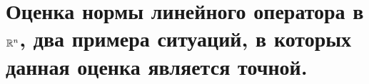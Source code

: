 \documentclass[../main.tex]{subfiles}
\begin{document}
\newpage
\section{Оценка нормы линейного оператора в \( \mathbb{R} ^n\), два примера ситуаций, в которых данная оценка является точной.}
\end{document}
